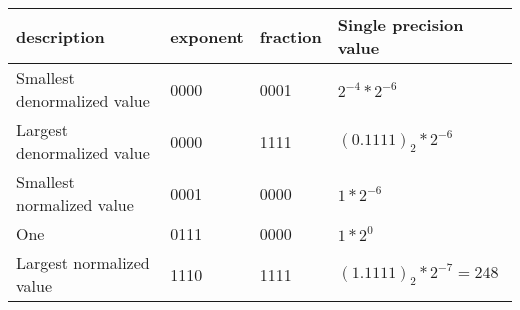 \documentclass[letterpaper, 11pt]{article}
\theoremstyle{mystyle}
\begin{document}
\begin{tabular}{M|M|M|M}
    \hline
    description                     & exponent  & fraction  & Single precision value \\ \hline
    Smallest denormalized value     & 0000      & 0001      & $2^{-4} * 2^{-6}$      \\
    Largest denormalized value      & 0000      & 1111      & $(0.1111)_2 * 2^{-6}$  \\
    Smallest normalized value       & 0001      & 0000      & $1 * 2^{-6}$           \\
    One                             & 0111      & 0000      & $1*2^0$                \\
    Largest normalized value        & 1110      & 1111      & $(1.1111)_2 * 2^{-7} = 248$  \\
\end{tabular}
\end{document}
